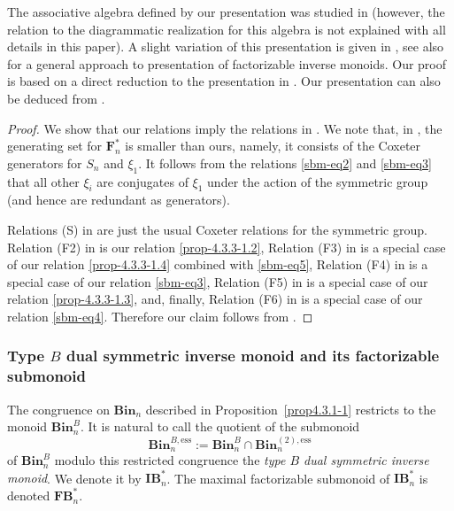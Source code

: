 \documentclass[a4paper]{amsart}
\begin{document}
The associative algebra defined by our presentation was studied in \cite{Ko}
(however, the relation to the diagrammatic realization for this algebra is not
explained with all details in this paper). A slight variation of this 
presentation is given in \cite{Fi03}, see also \cite{EEF} for
a general approach to presentation of factorizable inverse monoids.
Our proof is based on a direct reduction to the presentation in \cite[Theorem~3]{Fi03}.
Our presentation can also be deduced from \cite[Theorem~6.4 and Remark 6.5]{Ea06b}.

\begin{proof}
We show that our relations imply the relations in \cite[Theorem~3]{Fi03}.
We note that, in \cite[Theorem~3]{Fi03}, the generating set for $\mathbf{F}^*_n$
is smaller than ours, namely, it consists of the Coxeter generators for $S_n$
and $\xi_{1}$. It follows from the relations \eqref{sbm-eq2} and 
\eqref{sbm-eq3} that all other $\xi_{i}$ are
conjugates of $\xi_{1}$ under the action of the symmetric group
(and hence are redundant as generators).

Relations (S) in \cite[Theorem~3]{Fi03} are just the usual Coxeter relations
for the symmetric group. Relation (F2) in \cite[Theorem~3]{Fi03} is our
relation \eqref{prop-4.3.3-1.2}, Relation (F3) in \cite[Theorem~3]{Fi03} is 
a special case of our relation \eqref{prop-4.3.3-1.4} combined with 
\eqref{sbm-eq5}, Relation (F4) in \cite[Theorem~3]{Fi03} is a special case of 
our relation \eqref{sbm-eq3}, Relation (F5) in \cite[Theorem~3]{Fi03} is a special case of 
our relation \eqref{prop-4.3.3-1.3}, and, finally, Relation (F6) in 
\cite[Theorem~3]{Fi03} is a special case of  our relation \eqref{sbm-eq4}.
Therefore our claim follows from \cite[Theorem~3]{Fi03}.
\end{proof}


\subsubsection{Type $B$ dual symmetric inverse 
monoid and its factorizable submonoid}\label{s4.3.4}

The congruence on $\mathbf{Bin}_n$ described in Proposition~\ref{prop4.3.1-1}
restricts to the monoid $\mathbf{Bin}^{B}_n$. It is natural to call
the quotient of the submonoid
\begin{displaymath}
\mathbf{Bin}^{B,\mathrm{ess}}_n:=
\mathbf{Bin}^{B}_n\cap  \mathbf{Bin}^{(2),\mathrm{ess}}_n
\end{displaymath}
of $\mathbf{Bin}^{B}_n$ modulo this restricted congruence 
the {\em type $B$ dual symmetric inverse monoid}. 
We denote it by $\mathbf{IB}^*_n$.
The maximal factorizable submonoid of $\mathbf{IB}^*_n$ is denoted
$\mathbf{FB}^*_n$.
\end{document}
